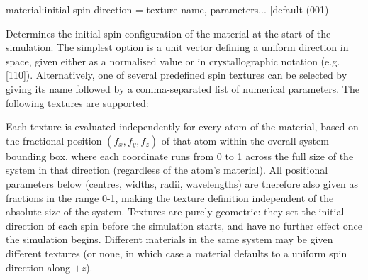{\zicf material:initial-spin-direction = texture-name, parameters... [default (001)]} Determines the initial spin configuration of the material at the start of the simulation. The simplest option is a unit vector defining a uniform direction in space, given either as a normalised value or in crystallographic notation (e.g. [110]). Alternatively, one of several predefined spin textures can be selected by giving its name followed by a comma-separated list of numerical parameters. The following textures are supported:

Each texture is evaluated independently for every atom of the material, based on the fractional position $(f_x, f_y, f_z)$ of that atom within the overall system bounding box, where each coordinate runs from 0 to 1 across the full size of the system in that direction (regardless of the atom's material). All positional parameters below (centres, widths, radii, wavelengths) are therefore also given as fractions in the range 0-1, making the texture definition independent of the absolute size of the system. Textures are purely geometric: they set the initial direction of each spin before the simulation starts, and have no further effect once the simulation begins. Different materials in the same system may be given different textures (or none, in which case a material defaults to a uniform spin direction along $+z$).

